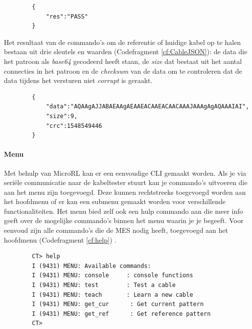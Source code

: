 \begin{listing}[H]
    \begin{verbatim}
        {
            "res":"PASS"
        }
    \end{verbatim}
    \caption[Test JSON]{Voorbeeld JSON van test of \textit{teach}.}
    \label{cf:TestJSON}
\end{listing}

Het resultaat van de commando's om de referentie of huidige kabel op te halen bestaan uit drie sleutels en waarden (Codefragment \ref{cf:CableJSON}): de data die het patroon als \textit{base64} gecodeerd heeft staan, de \textit{size} dat bestaat uit het aantal connecties in het patroon en de \textit{checksum} van de data om te controleren dat de data tijdens het versturen niet \textit{corrupt} is geraakt.

\begin{listing}[H]
    \begin{verbatim}
        {
            "data":"AQAAgAJJABAEAAgAEAAEACAAEACAACAAAJAAAgAgAQAAAIAI",
            "size":9,
            "crc":1548549446
        }
    \end{verbatim}
    \caption[Kabel JSON]{Voorbeeld JSON van het ophalen van een kabelpatroon.}
    \label{cf:CableJSON}
\end{listing}


\paragraph{Menu}

Met behulp van MicroRL kan er een eenvoudige \gls{CLI} gemaakt worden. Als je via seriële communicatie naar de kabeltester stuurt kan je commando's uitvoeren die aan het menu zijn toegevoegd. Deze kunnen rechtstreeks toegevoegd worden aan het hoofdmenu of er kan een submenu gemaakt worden voor verschillende functionaliteiten. Het menu bied zelf ook een hulp commando aan die meer info geeft over de mogelijke commando's binnen het menu waarin je je begeeft. Voor eenvoud zijn alle commando's die de \gls{MES} nodig heeft, toegevoegd aan het hoofdmenu (Codefragment \ref{cf:help}) \autocite{Microrl2011}.

\begin{listing}[H]
    \begin{verbatim}
        CT> help
        I (9431) MENU: Available commands:
        I (9431) MENU: console     : console functions
        I (9431) MENU: test        : Test a cable
        I (9431) MENU: teach       : Learn a new cable
        I (9431) MENU: get_cur      : Get current pattern
        I (9431) MENU: get_ref      : Get reference pattern
        CT> 
    \end{verbatim}
    \caption[Menu - help commando]{Resultaat van het help commando van het menu.}
    \label{cf:help}
\end{listing}


